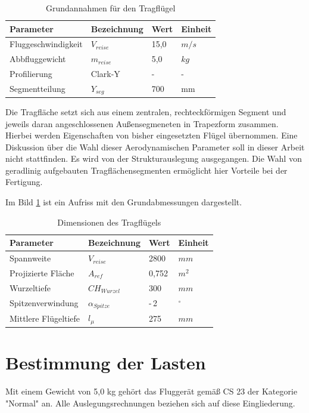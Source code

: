 \begin{table}[h]
\centering
\begin{tabular}{|l|l|l|l|}
\hline
Parameter  & Bezeichnung &  Wert & Einheit \\ \hline
Fluggeschwindigkeit  & $V_{reise}$ & 15,0 & $m/s$\\ \hline
Abbfluggewicht & $m_{reise}$  & 5,0 & $kg$\\ \hline
Profilierung & Clark-Y & - & - \\ \hline
Segmentteilung & $Y_{seg}$ & 700 & mm\\ \hline
\end{tabular}
\caption{Grundannahmen für den Tragflügel}
\label{tab:Grundannahmen für den Tragflügel}
\end{table}
Die Tragfläche setzt sich aus einem zentralen, rechteckförmigen Segment und jeweils daran angeschlossenen Außensegmeneten 
in Trapezform zusammen.
Hierbei werden Eigenschaften von bisher eingesetzten Flügel übernommen.
Eine Diskussion über die Wahl dieser Aerodynamischen Parameter soll in dieser Arbeit nicht stattfinden. 
Es wird von der Strukturauslegung ausgegangen.
Die Wahl von geradlinig aufgebauten Tragflächensegmenten ermöglicht hier Vorteile bei der Fertigung.

Im Bild \ref{} ist ein Aufriss mit den Grundabmessungen dargestellt.

\begin{table}[h]
\centering
\begin{tabular}{|l|l|l|l|}
\hline
Parameter  & Bezeichnung &  Wert & Einheit \\ \hline
Spannweite  & $V_{reise}$ & 2800 & $mm$\\ \hline
Projizierte Fläche & $A_{ref}$  & 0,752 & $m^2$\\ \hline
Wurzeltiefe & $CH_{Wurzel}$ & 300 & $mm$ \\ \hline
Spitzenverwindung & $\alpha_{Spitze}$ & -\,2 & $^\circ$\\ \hline
Mittlere Flügeltiefe & $l_{\mu}$ & 275 & $mm$ \\ \hline
\end{tabular}
\caption{Dimensionen des Tragflügels}
\label{tab:Dimensionen des Tragflügels}
\end{table}

\section{Bestimmung der Lasten}

Mit einem Gewicht von 5,0 kg gehört das Fluggerät gemäß CS 23 der Kategorie "Normal" an.
Alle Auslegungsrechnungen beziehen sich auf diese Eingliederung.

